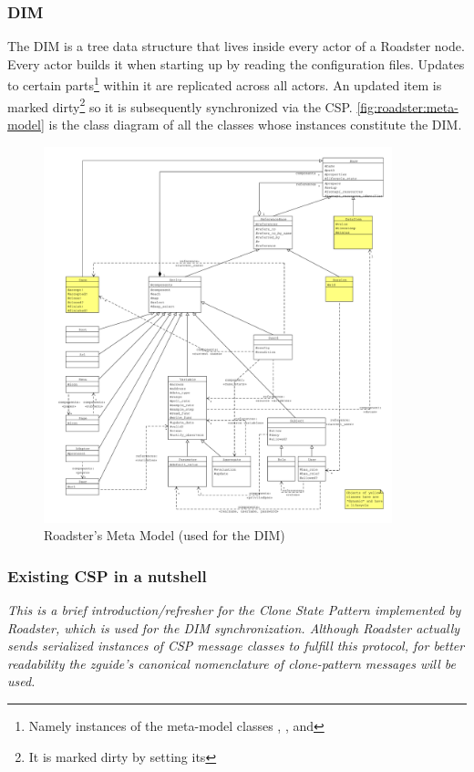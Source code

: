 \subsubsection{DIM}
The \acrfull{DIM} is a tree data structure that lives inside every actor of a Roadster
node. Every actor builds it when starting up by reading the configuration
files. Updates to certain parts\footnote{Namely instances of the meta-model
classes , , and } within it are replicated
across all actors. An updated item is marked dirty\footnote{It is marked dirty
by setting its } so it is subsequently synchronized
via the \gls{CSP}. \autoref{fig:roadster:meta-model} is the class diagram of
all the classes whose instances constitute the DIM.

\begin{figure}[]
	\includegraphics[trim=1.5cm 1cm 1cm 1cm, clip=true, width=0.9\textwidth]{img/meta_model.pdf}
	\caption{Roadster's Meta Model (used for the DIM)}
	\label{fig:roadster:meta-model}
\end{figure}

\subsubsection{Existing CSP in a nutshell}
\emph{This is a brief introduction/refresher for the Clone State Pattern
implemented by Roadster, which is used for the DIM synchronization. Although Roadster actually sends serialized instances
of CSP message classes to fulfill this protocol, for better readability the
\gls{zguide}'s canonical nomenclature of \gls{clone-pattern} messages will be used.}

